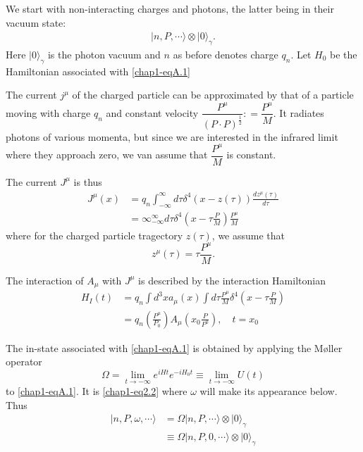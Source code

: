 We start with non-interacting charges and photons, the latter being in their vacuum state:
\begin{align*}
  |n, P, \cdots \rangle \otimes | 0 \rangle_\gamma. \label{chap1-eqA.1}\tag{A.1}
\end{align*}
Here $|0 \rangle_\gamma$ is the photon vacuum and $n$ as before denotes charge $q_n$. Let $H_0$ be the Hamiltonian associated with \eqref{chap1-eqA.1}

The current $j^\mu$ of the charged particle can be approximated by that of a particle moving with charge $q_n$ and constant velocity $\dfrac{P^\mu}{(P\cdot P)^{\frac{1}{2}}}: = \dfrac{P^\mu}{M}$. It radiates photons of various momenta, but since we are interested in the infrared limit where they approach zero, we van assume that $\dfrac{P^\mu}{M}$ is constant.

The current $J^\mu$ is thus
\begin{align*}
  J^\mu (x) & = q_n \int^\infty_{-\infty} d \tau \delta^4 (x- z (\tau)) \frac{dz^\mu(\tau)}{d\tau}\\
  & = \infty^\infty_{-\infty} d \tau \delta^4 \left(x- \tau \frac{P}{M}\right) \frac{P^\mu}{M}\label{chap1-eqA.2}\tag{A.2}
\end{align*}
where for the charged particle tragectory $z(\tau)$, we assume that
\begin{equation*}
z^\mu (\tau) = \tau \frac{P^\mu}{M}. \label{chap1-eqA.3}\tag{A.3}
\end{equation*}

The interaction of $A_\mu$ with $J^\mu$ is described by the interaction Hamiltonian
\begin{align*}
  H_I(t) & = q_n \int d^3 x a_\mu (x) \int d \tau \frac{P^\mu}{M} \delta^4 \left( x- \tau \frac{P}{M} \right) \label{chap1-eqA.4}\tag{A.4}\\
  & = q_n \left( \frac{P^\mu}{P_0}\right) A_\mu \left( x_0 \frac{P}{P^0}\right), \quad t= x_0 \label{chap1-eqA.5}\tag{A.5}
\end{align*}

The in-state associated with \eqref{chap1-eqA.1} is obtained by applying the M\o{}ller operator
\begin{equation*}
\Omega = \lim\limits_{t \to -\infty} e^{iHt}e^{-iH_0t}\equiv \lim\limits_{t \to -\infty} U(t)\label{chap1-eqA.6}\tag{A.6}
\end{equation*}
to \eqref{chap1-eqA.1}. It is \eqref{chap1-eq2.2} where $\omega$ will make its appearance below. Thus
\begin{align*}
  | n, P, \omega, \cdots \rangle & = \Omega | n, P, \cdots \rangle \otimes | 0 \rangle_\gamma\\
  & \equiv \Omega|n, P, 0, \cdots \rangle \otimes |0 \rangle_\gamma \label{chap1-eqA.7}\tag{A.7}
\end{align*}

